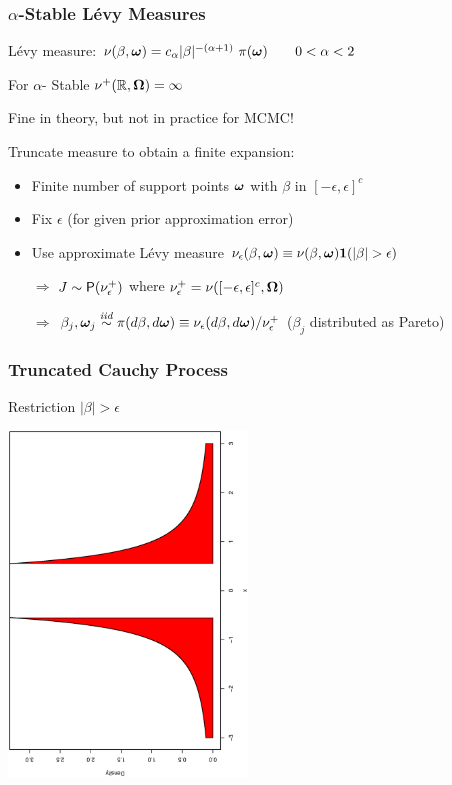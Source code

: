 \documentclass[]{beamer}\usepackage[]{graphicx}\usepackage[]{color}
\newcommand{\bs}[2]{\begin{frame} \frametitle{#1}
{#2}
\end{frame} }
\begin{document}
\bs{$\alpha$-Stable L\'evy Measures} {

L\'evy measure: $\nu(\beta, \bm \omega) =  c_\alpha |\beta|^{-(\alpha
    +1)}\ \pi(\bm \omega) \qquad 0 < \alpha < 2$ \pause

For $\alpha$- Stable $\nu^+(\mathbb{R}, \bm \Omega) = \infty$ \pause

Fine in theory, but not in practice for MCMC! \pause

\vspace{14pt}
Truncate measure to obtain a finite expansion:
\begin{itemize}
 \item Finite number of support points $\bm \omega$ with $\beta$ in
   $[-\epsilon, \epsilon]^c$  \pause
\item Fix $\epsilon$  (for given prior approximation error) \pause
\item Use approximate L\'evy  measure
$\nu_{\epsilon}(\beta, \bm \omega) \equiv \nu(\beta,
\bm \omega){\bm 1}(|\beta| > \epsilon) $ \pause
\item[$\Rightarrow$] $J \sim \mbox{\sf P}(\nu_{\epsilon}^+)$ where
  $\nu^+_{\epsilon} = \nu([-\epsilon, \epsilon]^c, \bm \Omega)$ \pause
\item[$\Rightarrow$]  $\beta_j, \bm \omega_j \mathrel{\mathop{\sim}\limits^{\mathit{iid}}} \pi(d\beta, d\bm \omega) \equiv
  \nu_\epsilon(d\beta , d \bm \omega)/\nu^+_{\epsilon}$ ($\beta_j$
  distributed as Pareto)

\end{itemize}
}


\bs{Truncated Cauchy Process} {
\centerline{Restriction  $|\beta| > \epsilon$}

\centerline{\includegraphics[width=2.5in,angle=270]{cauchy1.ps}}
}
\end{document}

